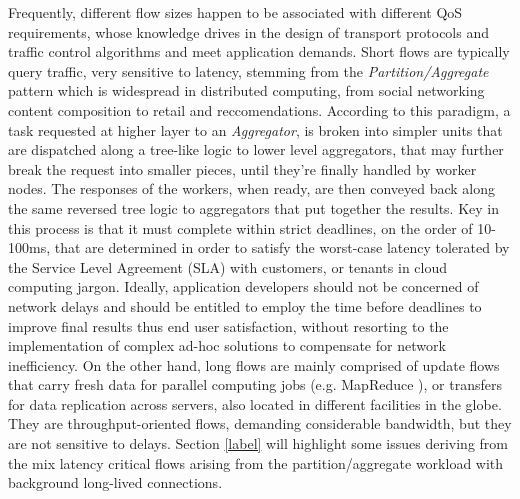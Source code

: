 Frequently, different flow sizes happen to be associated with different QoS requirements, whose knowledge drives in the design of transport protocols and traffic control algorithms and meet application demands. Short flows are typically query traffic, very sensitive to latency, stemming from the \textit{Partition/Aggregate} pattern which is widespread in distributed computing, from social networking content composition to retail and reccomendations. According to this paradigm, a task requested at higher layer to an \textit{Aggregator}, is broken into simpler units that are dispatched along a tree-like logic to lower level aggregators, that may further break the request into smaller pieces, until they're finally handled by worker nodes. The responses of the workers, when ready, are then conveyed back along the same reversed tree logic to aggregators that put together the results. Key in this process is that it must complete within strict deadlines, on the order of 10-100ms, that are determined in order to satisfy the worst-case latency tolerated by the Service Level Agreement (SLA) with customers, or tenants in cloud computing jargon. Ideally, application developers should not be concerned of network delays and should be entitled to employ the time before deadlines to improve final results thus end user satisfaction, without resorting to the implementation of complex ad-hoc solutions to compensate for network inefficiency. 
On the other hand, long flows are mainly comprised of update flows that carry fresh data for parallel computing jobs (e.g. MapReduce \cite{MapReduce}), or transfers for data replication across servers, also located in different facilities in the globe. They are throughput-oriented flows, demanding considerable bandwidth, but they are not sensitive to delays. Section \ref{label} will highlight some issues deriving from the mix latency critical  flows arising from the partition/aggregate workload with background long-lived connections.

